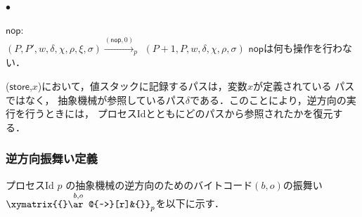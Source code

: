 \documentclass[submit,PRO]{ipsj}
\makeatletter
\newcommand{\longsquiggly}{\xymatrix{{}\ar@{~>}[r]&{}}}
\newcommand{\bcode}[1]{$\mathsf{#1}$}
\newcommand{\brightarrow}[1]{\stackrel{#1}{\longsquiggly}}
\makeatother
\begin{document}
\begin{list}{$\bullet$}{}
\item \bcode{nop}:\\
$(P,P',w,\delta,\chi,\rho,\xi,\sigma)\xrightarrow{(\mathsf{nop},0)}_p$\newline
\qquad $(P+1,P,w,\delta,\chi,\rho,\sigma)$\newline
\bcode{nop}は何も操作を行わない．
\end{list}

(\bcode{store},$x$)において，値スタックに記録するパスは，変数$x$が定義されている
パスではなく，
抽象機械が参照しているパス$\delta$である．このことにより，逆方向の実行を行うときには，
プロセスIdとともにどのパスから参照されたかを復元する．

\subsubsection{逆方向振舞い定義}

プロセスId $p$ の抽象機械の逆方向のためのバイトコード$(b,o)$の振舞い
$\brightarrow{b,o}_{p}$を以下に示す．
\end{document}
